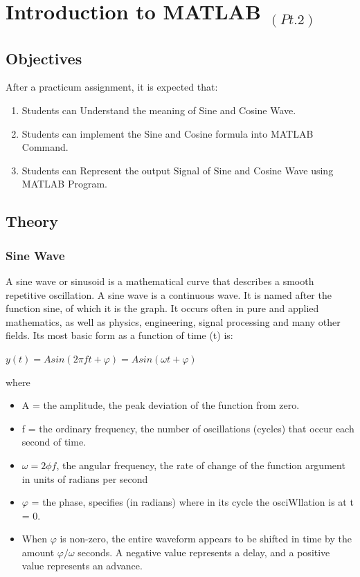 \documentclass[]{report}
\begin{document}

\chapter{Introduction to MATLAB $_{(Pt.2)}$}
\section{Objectives}
	\par 
	After a practicum assignment, it is expected that:	
	\begin{enumerate}
		\item Students can Understand the meaning of Sine and Cosine Wave.
		\item Students can implement the Sine and Cosine formula into MATLAB Command.
		\item Students can Represent the output Signal of Sine and Cosine Wave using MATLAB Program.		
	\end{enumerate}

\section{Theory}
	\subsection{Sine Wave}
		\par 
		A sine wave or sinusoid is a mathematical curve that describes a smooth repetitive oscillation. A sine wave is a continuous wave. It is named after the function sine, of which it is the graph. It occurs often in pure and applied mathematics, as well as physics, engineering, signal processing and many other fields. Its most basic form as a function of time (t) is: \\ 
		\begin{center}
			$ y(t)=Asin(2\pi f t + \varphi ) = Asin(\omega t + \varphi) $
		\end{center}
			
		where
		\begin{itemize}
			\item A = the amplitude, the peak deviation of the function from zero.
			\item f = the ordinary frequency, the number of oscillations (cycles) that occur each second of time.
			\item $ \omega = 2 \phi f $, the angular frequency, the rate of change of the function argument in units of radians per second
			\item $\varphi$ = the phase, specifies (in radians) where in its cycle the osciWllation is at t = 0.
			\item When $\varphi$ is non-zero, the entire waveform appears to be shifted in time by the amount $\varphi/\omega$ seconds. A negative value represents a delay, and a positive value represents an advance.
		\end{itemize}
\end{document}
